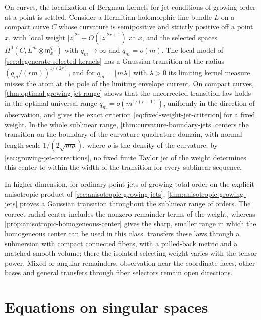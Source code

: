 On curves, the localization of Bergman kernels for jet conditions of growing order at a point is settled. Consider a Hermitian holomorphic line bundle $L$ on a compact curve $C$ whose curvature is semipositive and strictly positive off a point $x$, with local weight $|z|^{2r}+O(|z|^{2r+1})$ at $x$, and the selected spaces $H^0(C,L^m\otimes\mathfrak m_x^{q_m})$ with $q_m\to\infty$ and $q_m=o(m)$. The local model of \cref{sec:degenerate-selected-kernels} has a Gaussian transition at the radius $(q_m/(rm))^{1/(2r)}$, and for $q_m=\lfloor m\lambda\rfloor$ with $\lambda>0$ its limiting kernel measure misses the atom at the pole of the limiting envelope current. On compact curves, \cref{thm:optimal-growing-jet-range} shows that the uncorrected transition law holds in the optimal universal range $q_m=o(m^{1/(r+1)})$, uniformly in the direction of observation, and gives the exact criterion \eqref{eq:fixed-weight-jet-criterion} for a fixed weight. In the whole sublinear range, \cref{thm:curvature-boundary-jets} centers the transition on the boundary of the curvature quadrature domain, with normal length scale $1/(2\sqrt{m\rho})$, where $\rho$ is the density of the curvature; by \cref{sec:growing-jet-corrections}, no fixed finite Taylor jet of the weight determines this center to within the width of the transition for every sublinear sequence.

In higher dimension, for ordinary point jets of growing total order on the explicit anisotropic product of \cref{sec:anisotropic-growing-jets}, \cref{thm:anisotropic-growing-jets} proves a Gaussian transition throughout the sublinear range of orders. The correct radial center includes the nonzero remainder terms of the weight, whereas \cref{prop:anisotropic-homogeneous-center} gives the sharp, smaller range in which the homogeneous center can be used in this class.  transfers these laws through a submersion with compact connected fibers, with a pulled-back metric and a matched smooth volume; there the isolated selecting weight varies with the tensor power. Mixed or angular remainders, observation near the coordinate faces, other bases and general transfers through fiber selectors remain open directions.

\section{Equations on singular spaces}

